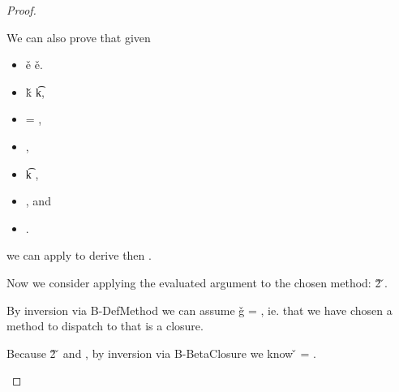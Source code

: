 \begin{lemma}
\begin{proof}
\begin{case}[B-BetaMulti]
\begin{itemize}
\begin{subcase}[T-App]
  We can also prove that given
        \begin{itemize}
          \item
  \judgementrewrite {\propenv{}} {\v{e}} 
  {
              {}
              {\x{}}}
             {
                         {}
                         {\x{}}}
                       {\replacefor
                         {}
                         {}
                         {\x{}}}
                       {\v{e}}.
    \item
  \judgementtwo {\propenv{}} {\v{k}} {\t{k}},
                     \item
         = {\true{}}, 
      \item
        \satisfies{\openv{}}{\propenv{}},
    \item
                       {\replacefor
                         {}
                         {}
                         {\x{}}}
  {\t{k}}{\filterset {\thenprop {\propp{}}} {\elseprop {\propp{}}}},
          \item
        \inpropenv{\thenprop{\propp{}}}{\thenprop{\propp{}}}, and
    \item
        \inpropenv{\elseprop{\propp{}}}{\elseprop{\propp{}}}.
        \end{itemize}
  we can apply  to derive
  then {\satisfies{\openv{}}{\thenprop{\propp{}}}}.

   Now we consider applying the evaluated argument to the chosen method:
  \opsem {\openv{}}
         { {\v{2}}}
         {\v{}}.

  By inversion via B-DefMethod we can assume {\v{g}} = {}, 
  ie. that we have chosen a method to dispatch to that is a closure.

  Because 
  \opsem {\openv{}}
         { {\v{2}}}
         {\v{}}
         and
    ,
  by inversion via B-BetaClosure we know {\v{}} = {}.


\end{subcase}
\end{itemize}
\end{case}
\end{proof}
\end{lemma}
